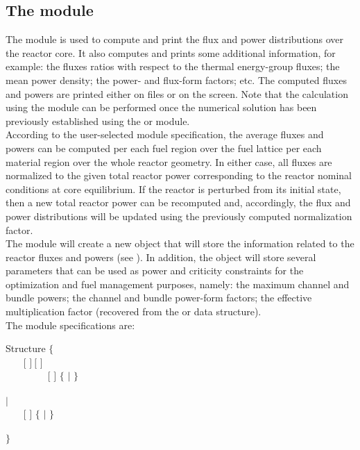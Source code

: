 \subsection{The  module}\label{sect:flpow}

\vskip 0.2cm
The  module is used to compute and print the flux and power
distributions over the reactor core. It also computes and prints some additional
information, for example: the fluxes ratios with respect to the thermal energy-group
fluxes; the mean power density; the power- and flux-form factors; etc. The computed
fluxes and powers are printed either on files or on the screen. Note that the calculation
using the  module can be performed once the numerical solution has
been previously established using the  or  module.\\

According to the user-selected module specification, the average fluxes and
powers can be computed per each fuel region over the fuel lattice 
per each material region over the whole reactor geometry. In either case, all fluxes
are normalized to the given total reactor power corresponding to the reactor nominal
conditions at core equilibrium. If the reactor is perturbed from its initial state, then a
new total reactor power can be recomputed and, accordingly, the flux and power
distributions will be updated using the previously computed normalization factor.\\

The  module will create a new  object that will store
the information related to the reactor fluxes and powers (see ). In addition,
the  object will store several parameters that can be used as power
and criticity constraints for the optimization and fuel management purposes, namely:
the maximum channel and bundle powers; the channel and bundle power-form factors;
the effective multiplication factor (recovered from the  or  data structure).\\

\noindent
The  module specifications are:

\begin{DataStructure}{Structure }
$\{$ \\
~~~ $[$  $]~[$  $]$ \\
~~~~~~~~\moc{:=}   $[$  $]$ 
$\{$  $|$  $\}$   \\
~~~~~~~~\moc{::}  \\
$|$ \\
~~~ \moc{:=}   $[$  $]$
$\{$  $|$  $\}$   \\
~~~~~~~~\moc{::}  \\
 $\}$
 \end{DataStructure}

